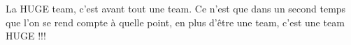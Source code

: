 La HUGE team, c'est avant tout une team. Ce n'est que dans un second
temps que l'on se rend compte \`a quelle point, en plus d'\^etre une
team, c'est une team HUGE !!!  



